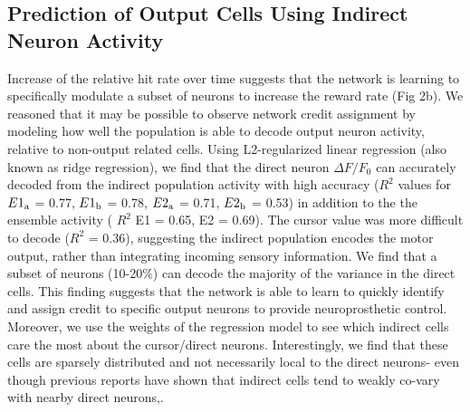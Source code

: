 \documentclass[letterpaper, 10 pt, conference]{ieeeconf}  %
\begin{document}
\subsection{Prediction of Output Cells Using Indirect Neuron Activity}
Increase of the relative hit rate over time suggests that the network is learning to specifically modulate a subset of neurons to increase the reward rate (Fig 2b). We reasoned that it may be possible to observe network credit assignment by modeling how well the population is able to decode output neuron activity, relative to non-output related cells. Using L2-regularized linear regression (also known as ridge regression), we find that the direct neuron $\Delta F/F_{0}$ can accurately decoded from the indirect population activity with high accuracy ($R^2$ values for $E1\textsubscript{a}$ = 0.77, $E1\textsubscript{b}$ =  0.78,  $E2\textsubscript{a}$ = 0.71, $E2\textsubscript{b}$ =  0.53) in addition to the the ensemble activity ( $R^2$ E1 = 0.65,  E2 = 0.69). The cursor value was more difficult to decode ($R^2$ = 0.36), suggesting the indirect population encodes the motor output, rather than integrating incoming sensory information. We find that a subset of neurons (10-20\%) can decode the majority of the variance in the direct cells. This finding suggests that the network is able to learn to quickly identify and assign credit to specific output neurons to provide neuroprosthetic control. Moreover, we use the weights of the regression model to see which indirect cells care the most about the cursor/direct neurons. Interestingly, we find that these cells are sparsely distributed and not necessarily local to the direct neurons- even though previous reports have shown that indirect cells tend to weakly co-vary with nearby direct neurons,\cite{Sriram2018-qy,Hahnloser2002-uf}.
\end{document}
